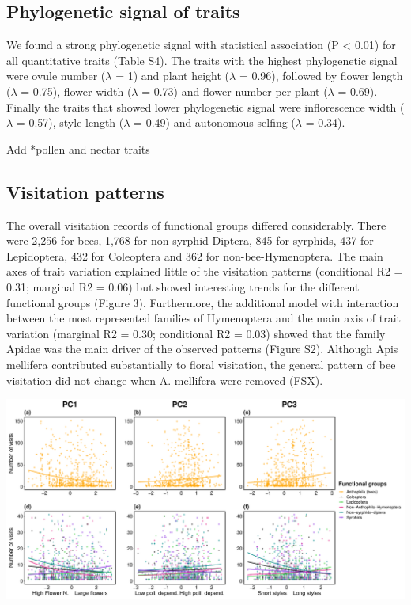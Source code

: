 \documentclass[12pt,a4paper,]{article}
\begin{document}
\subsection{Phylogenetic signal of
traits}\label{phylogenetic-signal-of-traits-1}

We found a strong phylogenetic signal with statistical association (P
\textless{} 0.01) for all quantitative traits (Table S4). The traits
with the highest phylogenetic signal were ovule number (\(\lambda\) = 1)
and plant height (\(\lambda\) = 0.96), followed by flower length
(\(\lambda\) = 0.75), flower width (\(\lambda\) = 0.73) and flower
number per plant (\(\lambda\) = 0.69). Finally the traits that showed
lower phylogenetic signal were inflorescence width (\(\lambda\) = 0.57),
style length (\(\lambda\) = 0.49) and autonomous selfing (\(\lambda\) =
0.34).

Add *pollen and nectar traits

\subsection{Visitation patterns}\label{visitation-patterns}

The overall visitation records of functional groups differed
considerably. There were 2,256 for bees, 1,768 for non-syrphid-Diptera,
845 for syrphids, 437 for Lepidoptera, 432 for Coleoptera and 362 for
non-bee-Hymenoptera. The main axes of trait variation explained little
of the visitation patterns (conditional R2 = 0.31; marginal R2 = 0.06)
but showed interesting trends for the different functional groups
(Figure 3). Furthermore, the additional model with interaction between
the most represented families of Hymenoptera and the main axis of trait
variation (marginal R2 = 0.30; conditional R2 = 0.03) showed that the
family Apidae was the main driver of the observed patterns (Figure S2).
Although Apis mellifera contributed substantially to floral visitation,
the general pattern of bee visitation did not change when A. mellifera
were removed (FSX).

\includegraphics{output/figures/unnamed-chunk-6-1.pdf}
\end{document}
